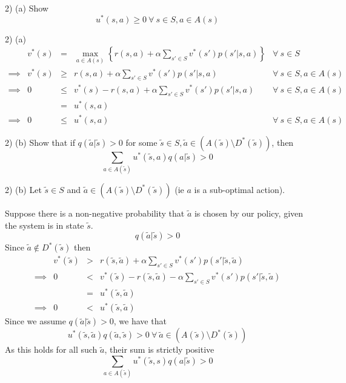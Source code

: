 \documentclass[11pt,a4paper]{article}
\begin{document}
\begin{question}{2) (a)}
  Show
  \[ u^*(s,a)\geq0\ \forall\ s\in S,a\in A(s) \]
\end{question}

\begin{answer}{2) (a)}
  \[\begin{array}{rrcll}
    &v^*(s)&=&\max_{a\in A(s)}\left\{r(s,a)+\alpha\sum_{s'\in S}v^*(s')p(s'|s,a)\right\}&\forall\ s\in S\\
    \implies&v^*(s)&\geq&r(s,a)+\alpha\sum_{s'\in S}v^*(s')p(s'|s,a)&\forall\ s\in S,a\in A(s)\\
    \implies&0&\leq&v^*(s)-r(s,a)+\alpha\sum_{s'\in S}v^*(s')p(s'|s,a)&\forall\ s\in S,a\in A(s)\\
    &&=&u^*(s,a)\\
    \implies&0&\leq&u^*(s,a)&\forall\ s\in S,a\in A(s)
  \end{array}\]
\end{answer}

\begin{question}{2) (b)}
  Show that if $q(\tilde{a}|\tilde{s})>0$ for some $\tilde{s}\in S,\tilde{a}\in(A(\tilde{s})\setminus D^*(\tilde{s}))$, then
  \[ \sum_{a\in A(\tilde{s})}u^*(\tilde{s},a)q(a|\tilde{s})>0 \]
\end{question}

\begin{answer}{2) (b)}
  Let $\tilde{s}\in S$ and $\tilde{a}\in (A(\tilde{s})\setminus D^*(\tilde{s}))$ (ie $a$ is a sub-optimal action).
  \par Suppose there is a non-negative probability that $\tilde{a}$ is chosen by our policy, given the system is in state $\tilde{s}$.
  \[ q(\tilde{a}|\tilde{s})>0 \]
  Since $\tilde{a}\not\in D^*(\tilde{s})$ then
  \[\begin{array}{rrcl}
    &v^*(\tilde{s})&>&r(\tilde{s},\tilde{a})+\alpha\sum_{s'\in S}v^*(s')p(s'|\tilde{s},\tilde{a})\\
    \implies&0&<&v^*(\tilde{s})-r(\tilde{s},\tilde{a})-\alpha\sum_{s'\in S}v^*(s')p(s'|\tilde{s},\tilde{a})\\
    &&=&u^*(\tilde{s},\tilde{a})\\
    \implies&0&<&u^*(\tilde{s},\tilde{a})
  \end{array}\]
  Since we assume $q(\tilde{a}|\tilde{s})>0$, we have that
  \[ u^*(\tilde{s},\tilde{a})q(\tilde{a},\tilde{s})>0\ \forall\ \tilde{a}\in (A(\tilde{s})\setminus D^*(\tilde{s})) \]
  As this holds for all such $\tilde{a}$, their sum is strictly positive
  \[ \sum_{a\in A(\tilde{s})}u^*(\tilde{s},s)q(a|\tilde{s})>0 \]
\end{answer}
\end{document}
